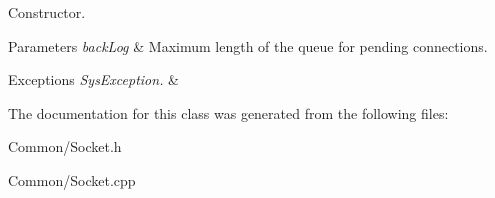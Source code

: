Constructor. 


\begin{DoxyParams}{Parameters}
{\em back\-Log} & Maximum length of the queue for pending connections.\\
\hline
\end{DoxyParams}

\begin{DoxyExceptions}{Exceptions}
{\em Sys\-Exception.} & \\
\hline
\end{DoxyExceptions}


The documentation for this class was generated from the following files\-:\begin{DoxyCompactItemize}
\item 
Common/Socket.\-h\item 
Common/Socket.\-cpp\end{DoxyCompactItemize}
